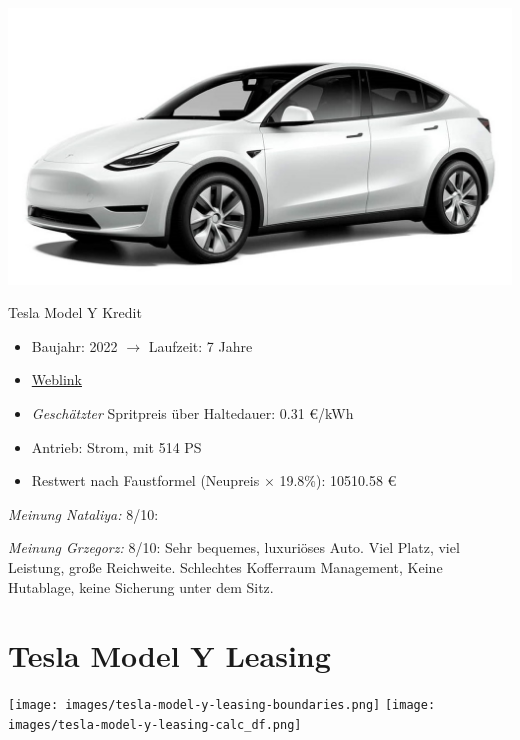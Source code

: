 \documentclass[landscape, DIV=99, 14pt]{scrartcl}
\begin{document}
\pagebreak
\begin{center}
\includegraphics[width=0.9\columnwidth]{cars/tesla-model-y.jpg}

Tesla Model Y Kredit
\end{center}

\begin{itemize}
    \item Baujahr: 2022 $\rightarrow$ Laufzeit: 7 Jahre
    \item \href{https://www.tesla.com/de_de/modely/design\#overview}{Weblink}
    \item \emph{Gesch\"atzter} Spritpreis \"uber Haltedauer: 0.31 \euro{}/kWh
    \item Antrieb: Strom, mit 514 PS
    \item Restwert nach Faustformel (Neupreis $\times$ 19.8\%): 10510.58 \euro{}
\end{itemize}

\begin{small}
\emph{Meinung Nataliya:} 8/10: 
        
\emph{Meinung Grzegorz:} 8/10: Sehr bequemes, luxuri\"oses Auto. Viel Platz, viel Leistung, gro\ss{}e Reichweite. Schlechtes Kofferraum Management, Keine Hutablage, keine Sicherung unter dem Sitz.
\end{small}

\pagebreak


\twocolumn

\section*{Tesla Model Y Leasing}
\begin{center}
\texttt{[image: images/tesla-model-y-leasing-boundaries.png]}
\null
\vspace{0.5cm}
\texttt{[image: images/tesla-model-y-leasing-calc\_df.png]}
\end{center}
\end{document}
